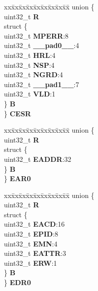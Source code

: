 \begin{DoxyCompactItemize}
\begin{tabbing}
\end{tabbing}\item 
\mbox{\label{structMPU__tag_a1cf5df3a6629f9a6e23f55788a13d8ee}} 
\begin{tabbing}
xx\=xx\=xx\=xx\=xx\=xx\=xx\=xx\=xx\=\kill
union \{\\
\>uint32\_t {\bfseries R}\\
\>struct \{\\
\>\>uint32\_t {\bfseries MPERR}:8\\
\>\>uint32\_t {\bfseries \_\_pad0\_\_}:4\\
\>\>uint32\_t {\bfseries HRL}:4\\
\>\>uint32\_t {\bfseries NSP}:4\\
\>\>uint32\_t {\bfseries NGRD}:4\\
\>\>uint32\_t {\bfseries \_\_pad1\_\_}:7\\
\>\>uint32\_t {\bfseries VLD}:1\\
\>\} {\bfseries B}\\
\} {\bfseries CESR}\\

\end{tabbing}\item 
\mbox{\label{structMPU__tag_a33998d27aa4373a8b0b329a2a560bd76}} 
\begin{tabbing}
xx\=xx\=xx\=xx\=xx\=xx\=xx\=xx\=xx\=\kill
union \{\\
\>uint32\_t {\bfseries R}\\
\>struct \{\\
\>\>uint32\_t {\bfseries EADDR}:32\\
\>\} {\bfseries B}\\
\} {\bfseries EAR0}\\

\end{tabbing}\item 
\mbox{\label{structMPU__tag_ac69beb7afeec3d056136046ce9fe19c6}} 
\begin{tabbing}
xx\=xx\=xx\=xx\=xx\=xx\=xx\=xx\=xx\=\kill
union \{\\
\>uint32\_t {\bfseries R}\\
\>struct \{\\
\>\>uint32\_t {\bfseries EACD}:16\\
\>\>uint32\_t {\bfseries EPID}:8\\
\>\>uint32\_t {\bfseries EMN}:4\\
\>\>uint32\_t {\bfseries EATTR}:3\\
\>\>uint32\_t {\bfseries ERW}:1\\
\>\} {\bfseries B}\\
\} {\bfseries EDR0}\\


\end{tabbing}
\end{DoxyCompactItemize}
